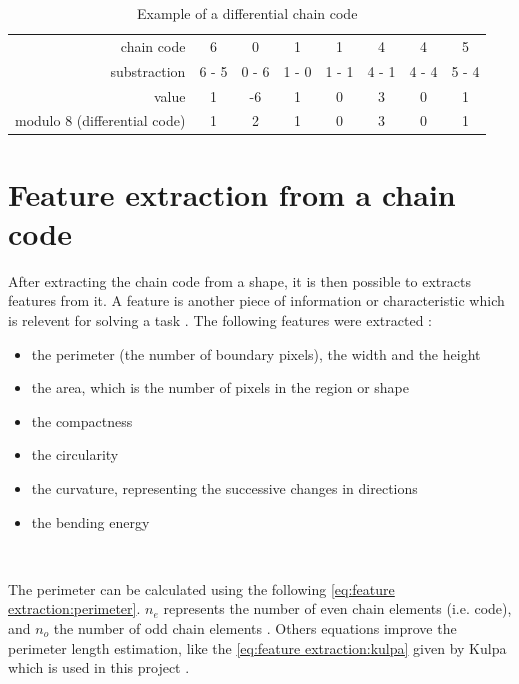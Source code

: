 \begin{table}[ht]
	\centering
	\caption{Example of a differential chain code}
	\label{tab:chain code:differential chain code}
	\begin{tabular}{rccccccc}
\toprule 
chain code   & 6     & 0     & 1     & 1     & 4     & 4     & 5     \\
substraction & 6 - 5 & 0 - 6 & 1 - 0 & 1 - 1 & 4 - 1 & 4 - 4 & 5 - 4 \\
value     	 & 1     & -6    & 1     & 0     & 3     & 0     & 1     \\
modulo 8 (differential code)  	 & 1     & 2     & 1     & 0     & 3     & 0     & 1     \\ 
\bottomrule 
	\end{tabular}
\end{table}






\section{Feature extraction from a chain code}

After extracting the chain code from a shape, it is then possible to extracts features from it. A feature is another piece of information or characteristic which is relevent for solving a task \cite{bib:extraction:definition}. The following features were extracted : 
\begin{itemize}
	\item the perimeter (the number of boundary pixels), the width and the height
	\item the area, which is the number of pixels in the region or shape 
	\item the compactness 
	\item the circularity 
	\item the curvature, representing the successive changes in directions 
	\item the bending energy 
\end{itemize}

~~ 

The perimeter can be calculated using the following \vref{eq:feature extraction:perimeter}. $n_e$ represents the number of even chain elements (i.e. code), and $n_o$ the number of odd chain elements \cite{bib:chain:EstimateAreasAndPerimetersChainCode}. Others equations improve the perimeter length estimation, like the \vref{eq:feature extraction:kulpa} given by Kulpa which is used in this project \cite{bib:chain:ObjectDescription}.

